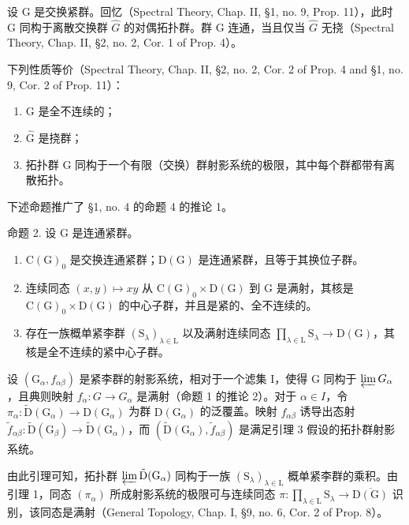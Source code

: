 
设 G 是交换紧群。回忆（Spectral Theory, Chap. II, §1, no. 9, Prop. 11），此时 G 同构于离散交换群 \(\hat{G}\) 的对偶拓扑群。群 G 连通，当且仅当 \(\hat{G}\) 无挠（Spectral Theory, Chap. II, §2, no. 2, Cor. 1 of Prop. 4）。

下列性质等价（Spectral Theory, Chap. II, §2, no. 2, Cor. 2 of Prop. 4 and §1, no. 9, Cor. 2 of Prop. 11）：

\begin{enumerate}
\def\labelenumi{(\roman{enumi})}
\item
  G 是全不连续的；
\item
  \(\hat{\mathrm{G}}\) 是挠群；
\item
  拓扑群 G 同构于一个有限（交换）群射影系统的极限，其中每个群都带有离散拓扑。
\end{enumerate}

下述命题推广了 §1, no. 4 的命题 4 的推论 1。

命题 2. 设 G 是连通紧群。

\begin{enumerate}
\def\labelenumi{\alph{enumi})}
\item
  \(\mathrm{C}(\mathrm{G})_{0}\) 是交换连通紧群；\(\mathrm{D}(\mathrm{G})\) 是连通紧群，且等于其换位子群。
\item
  连续同态 \((x,y)\mapsto xy\) 从 \(\mathrm{C}(\mathrm{G})_{0}\times\mathrm{D}(\mathrm{G})\) 到 G 是满射，其核是 \(\mathrm{C}(\mathrm{G})_{0}\times\mathrm{D}(\mathrm{G})\) 的中心子群，并且是紧的、全不连续的。
\item
  存在一族概单紧李群 \((\mathrm{S}_{\lambda})_{\lambda\in\mathrm{L}}\) 以及满射连续同态 \(\prod_{\lambda\in\mathrm{L}}\mathrm{S}_{\lambda}\to\mathrm{D}(\mathrm{G})\)，其核是全不连续的紧中心子群。
\end{enumerate}

设 \((\mathrm{G}_{\alpha}, f_{\alpha\beta})\) 是紧李群的射影系统，相对于一个滤集 I，使得 G 同构于 \(\varprojlim G_{\alpha}\)，且典则映射 \(f_{\alpha}: G \to G_{\alpha}\) 是满射（命题 1 的推论 2）。对于 \(\alpha \in I\)，令 \(\pi_{\alpha}: \tilde{\mathrm{D}}(\mathrm{G}_{\alpha}) \to \mathrm{D}(\mathrm{G}_{\alpha})\) 为群 \(\mathrm{D}(\mathrm{G}_{\alpha})\) 的泛覆盖。映射 \(f_{\alpha\beta}\) 诱导出态射 \(\tilde{f}_{\alpha\beta}: \tilde{\mathrm{D}}(\mathrm{G}_{\beta}) \to \tilde{\mathrm{D}}(\mathrm{G}_{\alpha})\)，而 \((\tilde{\mathrm{D}}(\mathrm{G}_{\alpha}), \tilde{f}_{\alpha\beta})\) 是满足引理 3 假设的拓扑群射影系统。

由此引理可知，拓扑群 \(\varprojlim\tilde{\mathrm{D}}(\mathrm{G}_{\alpha})\) 同构于一族 \((\mathrm{S}_{\lambda})_{\lambda\in\mathrm{L}}\) 概单紧李群的乘积。由引理 1，同态 \((\pi_{\alpha})\) 所成射影系统的极限可与连续同态 \(\pi:\prod_{\lambda\in\mathrm{L}}\mathrm{S}_{\lambda}\to\overline{\mathrm{D}(\mathrm{G})}\) 识别，该同态是满射（General Topology, Chap. I, §9, no. 6, Cor. 2 of Prop. 8）。

